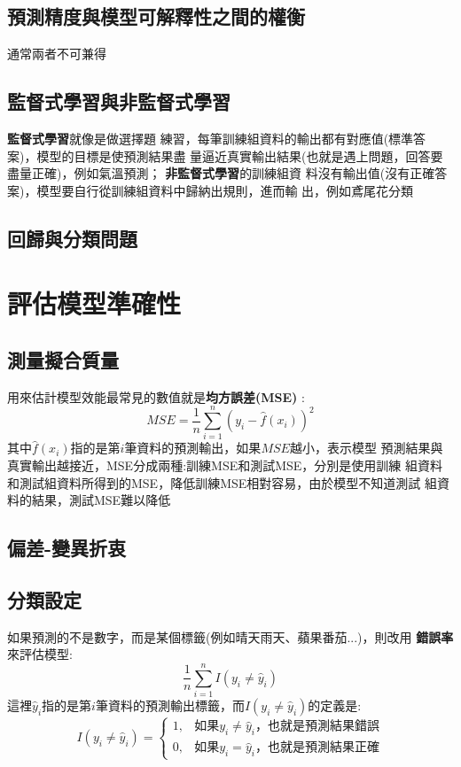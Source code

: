 \documentclass{report} %
\begin{document}
    \subsection{預測精度與模型可解釋性之間的權衡}
      通常兩者不可兼得
    \subsection{監督式學習與非監督式學習}
      {\bf 監督式學習}就像是做選擇題
        練習，每筆訓練組資料的輸出都有對應值(標準答案)，模型的目標是使預測結果盡
        量逼近真實輸出結果(也就是遇上問題，回答要盡量正確)，例如氣溫預測；{\bf
        非監督式學習}的訓練組資
        料沒有輸出值(沒有正確答案)，模型要自行從訓練組資料中歸納出規則，進而輸
        出，例如鳶尾花分類
    \subsection{回歸與分類問題}
  \section{評估模型準確性}
    \subsection{測量擬合質量}
      用來估計模型效能最常見的數值就是{\bf 均方誤差(MSE)} :
      \begin{equation}
        MSE = \frac{1}{n}\sum_{i = 1} ^ {n}(y_i - \hat{f}(x_i)) ^ 2
      \end{equation}
      其中$\hat{f}(x_i)$指的是第$i$筆資料的預測輸出，如果$MSE$越小，表示模型
        預測結果與真實輸出越接近，MSE分成兩種:訓練MSE和測試MSE，分別是使用訓練
        組資料和測試組資料所得到的MSE，降低訓練MSE相對容易，由於模型不知道測試
        組資料的結果，測試MSE難以降低
    \subsection{偏差-變異折衷}
    \subsection{分類設定}
      如果預測的不是數字，而是某個標籤(例如晴天雨天、蘋果番茄...)，則改用{\bf
        錯誤率}來評估模型:
      \begin{equation}
        \frac{1}{n}\sum_{i = 1} ^ {n}I(y_i \neq \hat{y}_i)
      \end{equation}
      這裡$\hat{y}_i$指的是第$i$筆資料的預測輸出標籤，而$I(y_i \neq
        \hat{y}_i)$的定義是:
      \[
        I(y_i \neq \hat{y}_i) =
        \left\{
          \begin{array}{cc}
            1, & \mbox{如果$y_i \neq \hat{y}_i$，也就是預測結果錯誤} \\
            0, & \mbox{如果$y_i = \hat{y}_i$，也就是預測結果正確}
          \end{array}
        \right.
      \]
\end{document}
